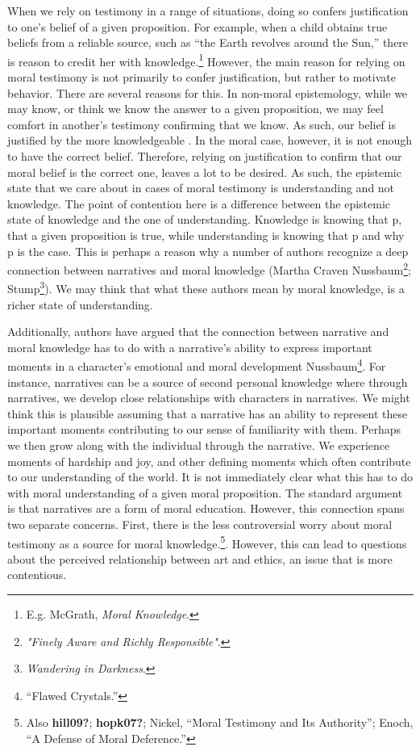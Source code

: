 \documentclass[
  12pt,
]{book}
\theoremstyle{definition}
\theoremstyle{definition}
\theoremstyle{definition}
\theoremstyle{definition}
\theoremstyle{remark}
\begin{document}
When we rely on testimony in a range of situations, doing so confers justification to one's belief of a given proposition. For example, when a child obtains true beliefs from a reliable source, such as ``the Earth revolves around the Sun,'' there is reason to credit her with knowledge.\footnote{E.g. McGrath, \emph{Moral {Knowledge}}.} However, the main reason for relying on moral testimony is not primarily to confer justification, but rather to motivate behavior. There are several reasons for this. In non-moral epistemology, while we may know, or think we know the answer to a given proposition, we may feel comfort in another's testimony confirming that we know. As such, our belief is justified by the more knowledgeable . In the moral case, however, it is not enough to have the correct belief. Therefore, relying on justification to confirm that our moral belief is the correct one, leaves a lot to be desired. As such, the epistemic state that we care about in cases of moral testimony is understanding and not knowledge. The point of contention here is a difference between the epistemic state of knowledge and the one of understanding. Knowledge is knowing that p, that a given proposition is true, while understanding is knowing that p and why p is the case. This is perhaps a reason why a number of authors recognize a deep connection between narratives and moral knowledge (Martha Craven Nussbaum\footnote{\emph{"{Finely Aware} and {Richly Responsible}"}.}; Stump\footnote{\emph{Wandering in {Darkness}}.}). We may think that what these authors mean by moral knowledge, is a richer state of understanding.

Additionally, authors have argued that the connection between narrative and moral knowledge has to do with a narrative's ability to express important moments in a character's emotional and moral development Nussbaum\footnote{{``Flawed {Crystals}.''}}. For instance, narratives can be a source of second personal knowledge where through narratives, we develop close relationships with characters in narratives. We might think this is plausible assuming that a narrative has an ability to represent these important moments contributing to our sense of familiarity with them. Perhaps we then grow along with the individual through the narrative. We experience moments of hardship and joy, and other defining moments which often contribute to our understanding of the world. It is not immediately clear what this has to do with moral understanding of a given moral proposition. The standard argument is that narratives are a form of moral education. However, this connection spans two separate concerns. First, there is the less controversial worry about moral testimony as a source for moral knowledge.\footnote{Also \textbf{hill09?}; \textbf{hopk07?}; Nickel, {``Moral {Testimony} and Its {Authority}''}; Enoch, {``A {Defense} of {Moral Deference}.''}}. However, this can lead to questions about the perceived relationship between art and ethics, an issue that is more contentious.
\end{document}
